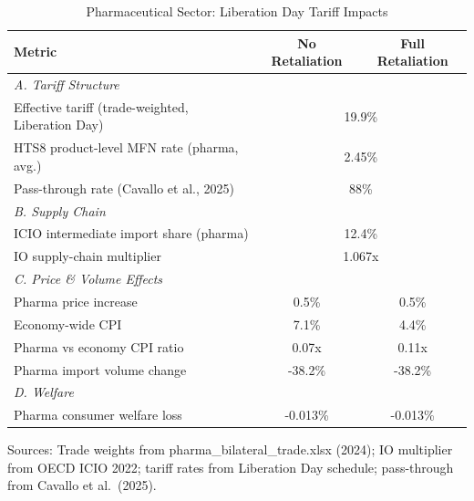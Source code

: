 \begin{table}[H]
\centering
\caption{Pharmaceutical Sector: Liberation Day Tariff Impacts}
\label{tab:pharma_price}
\begin{tabular}{lcc}
\toprule
Metric & No Retaliation & Full Retaliation \\
\midrule
\multicolumn{3}{l}{\textit{A. Tariff Structure}} \\[2pt]
Effective tariff (trade-weighted, Liberation Day) & \multicolumn{2}{c}{19.9\%} \\
HTS8 product-level MFN rate (pharma, avg.) & \multicolumn{2}{c}{2.45\%} \\
Pass-through rate (Cavallo et al., 2025) & \multicolumn{2}{c}{88\%} \\
[4pt]\multicolumn{3}{l}{\textit{B. Supply Chain}} \\[2pt]
ICIO intermediate import share (pharma) & \multicolumn{2}{c}{12.4\%} \\
IO supply-chain multiplier & \multicolumn{2}{c}{1.067x} \\
[4pt]\multicolumn{3}{l}{\textit{C. Price \& Volume Effects}} \\[2pt]
Pharma price increase & 0.5\% & 0.5\% \\
Economy-wide CPI & 7.1\% & 4.4\% \\
Pharma vs economy CPI ratio & 0.07x & 0.11x \\
Pharma import volume change & -38.2\% & -38.2\% \\
[4pt]\multicolumn{3}{l}{\textit{D. Welfare}} \\[2pt]
Pharma consumer welfare loss & -0.013\% & -0.013\% \\
\bottomrule
\end{tabular}
\begin{tablenotes}
\small
\item Sources: Trade weights from pharma\_bilateral\_trade.xlsx (2024); IO multiplier from OECD ICIO 2022; tariff rates from Liberation Day
schedule; pass-through from Cavallo et al.\ (2025).
\end{tablenotes}
\end{table}